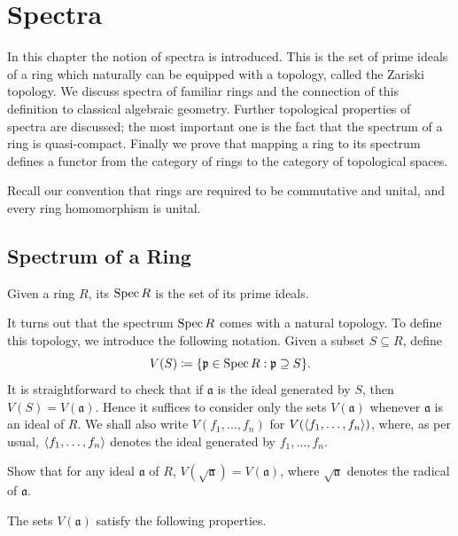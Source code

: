 	\chapter{Spectra}

In this chapter the notion of spectra is introduced. This is the set of prime ideals of a ring which naturally can be equipped with a topology, called the Zariski topology. We discuss spectra of familiar rings and the connection of this definition to classical algebraic geometry. Further topological properties of spectra are discussed; the most important one is the fact that the spectrum of a ring is quasi-compact. Finally we prove that mapping a ring to its spectrum defines a functor from the category of rings to the category of topological spaces.

Recall our convention that rings are required to be commutative and unital, and every ring homomorphism is unital.

\section{Spectrum of a Ring}
\begin{definition}
	Given a ring $R$, its  $\operatorname{Spec} R$ is the set of its prime ideals.
\end{definition}

It turns out that the spectrum $\operatorname{Spec} R$ comes with a natural topology. To define this topology, we introduce the following notation. Given a subset $S \subseteq R$, define
\begin{equation*}
	V(S) \coloneqq \lbrace \mathfrak{p} \in \operatorname{Spec} R : \mathfrak{p} \supseteq S\rbrace.
\end{equation*}
It is straightforward to check that if $\mathfrak{a}$ is the ideal generated by $S$, then $V(S) = V(\mathfrak{a})$. Hence it suffices to consider only the sets $V(\mathfrak{a})$ whenever $\mathfrak{a}$ is an ideal of $R$. We shall also write $V(f_1, \dotsc, f_n)$ for $V(\langle f_1, \dotsc, f_n\rangle)$, where, as per usual, $\langle f_1, \dotsc, f_n\rangle$ denotes the ideal generated by $f_1, \dotsc, f_n$. 

\begin{exercise}
	Show that for any ideal $\mathfrak{a}$ of $R$, $V(\sqrt{\mathfrak{a}}) = V(\mathfrak{a})$, where $\sqrt{\mathfrak{a}}$ denotes the radical of $\mathfrak{a}$.
\end{exercise}

The sets $V(\mathfrak{a})$ satisfy the following properties.

